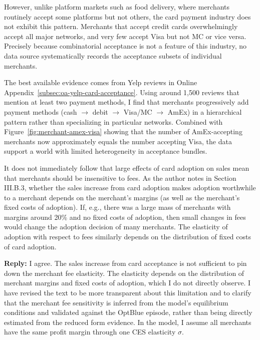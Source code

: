 \documentclass[main.tex]{subfiles}
\begin{document}
\begin{refsection}
However, unlike platform markets such as food delivery, where merchants routinely accept some platforms but not others, the card payment industry does not exhibit this pattern.
Merchants that accept credit cards overwhelmingly accept all major networks, and very few accept Visa but not MC or vice versa.
Precisely because combinatorial acceptance is not a feature of this industry, no data source systematically records the acceptance subsets of individual merchants.

The best available evidence comes from Yelp reviews in Online Appendix~\ref{subsec:oa-yelp-card-acceptance}.
Using around 1,500 reviews that mention at least two payment methods,
I find that merchants progressively add payment methods (cash $\to$ debit $\to$ Visa/MC $\to$ AmEx) in a hierarchical pattern rather than specializing in particular networks.
Combined with Figure~\ref{fig:merchant-amex-visa} showing that the number of AmEx-accepting merchants now approximately equals the number accepting Visa, the data support a world with limited heterogeneity in acceptance bundles.

\begin{refcommentnoclear}
It does not immediately follow that large effects of card adoption on sales mean that merchants should be insensitive to fees.
As the author notes in Section III.B.3, whether the sales increase from card adoption makes adoption worthwhile to a merchant depends on the merchant's margins (as well as the merchant's fixed costs of adoption).
If, e.g., there was a large mass of merchants with margins around 20\% and no fixed costs of adoption, then small changes in fees would change the adoption decision of many merchants.
The elasticity of adoption with respect to fees similarly depends on the distribution of fixed costs of card adoption.
\end{refcommentnoclear}

\textbf{Reply:} I agree.
The sales increase from card acceptance is not sufficient to pin down the merchant fee elasticity.
The elasticity depends on the distribution of merchant margins and fixed costs of adoption, which I do not directly observe.
I have revised the text to be more transparent about this limitation and to clarify that the merchant fee sensitivity is inferred from the model's equilibrium conditions and validated against the OptBlue episode, rather than being directly estimated from the reduced form evidence.
In the model, I assume all merchants have the same profit margin through one CES elasticity $\sigma$.


\end{refsection}
\end{document}

